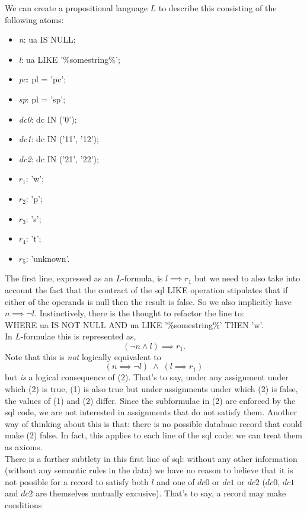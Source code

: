 \documentclass[../MathsNotesBase.tex]{subfiles}
\begin{document}
{\begin{exe}
			We can create a propositional language $L$ to describe this consisting of the following atoms:
			\begin{itemize}
				\item \textit{n}: ua IS NULL;
				\item \textit{l}: ua LIKE '\%somestring\%';
				\item \textit{pc}: pl = 'pc';
				\item \textit{sp}: pl = 'sp';
				\item \textit{dc0}: dc IN ('0');
				\item \textit{dc1}: dc IN ('11', '12');
				\item \textit{dc2}: dc IN ('21', '22');
				\item \textit{$r_1$}: 'w';
				\item \textit{$r_2$}: 'p';
				\item \textit{$r_3$}: 's';
				\item \textit{$r_4$}: 't';
				\item \textit{$r_5$}: 'unknown'.
			\end{itemize}
		
			\nl[4]
			The first line, expressed as an $L$-formula, is ${ l \implies r_1 }$ but we need to also take into account the fact that the contract of the sql LIKE operation stipulates that if either of the operands is null then the result is false. So we also implicitly have ${ n \implies \lnot l }$. Instinctively, there is the thought to refactor the line to:\\
			
			WHERE ua IS NOT NULL AND ua LIKE '\%somestring\%' THEN 'w'.\\
			
			In $L$-formulae this is represented as,
			\[ (\lnot n \land l) \implies r_1.  \tag{1} \]
			Note that this is \textit{not} logically equivalent to
			\[ (n \implies \lnot l) \; \land \; (l \implies r_1) \tag{2} \]
			but \textit{is} a logical consequence of (2). That's to say, under any assignment under which (2) is true, (1) is also true but under assignments under which (2) is false, the values of (1) and (2) differ. Since the subformulae in (2) are enforced by the sql code, we are not interested in assignments that do not satisfy them. Another way of thinking about this is that: there is no possible database record that could make (2) false. In fact, this applies to each line of the sql code: we can treat them as axioms.\\
			
			There is a further subtlety in this first line of sql: without any other information (without any semantic rules in the data) we have no reason to believe that it is not possible for a record to satisfy both $l$ and one of $dc0$ or $dc1$ or $dc2$ ($dc0$, $dc1$ and $dc2$ are themselves mutually excusive). That's to say, a record may make conditions\\
			

\end{exe}}
\end{document}
